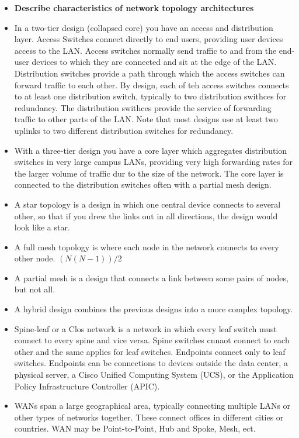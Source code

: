 \documentclass{article}
\begin{document}
\begin{itemize}
  \item \textbf{Describe characteristics of network topology architectures}
  	\item[] In a two-tier design (collapsed core) you have an access and distribution layer. Access Switches connect directly to end users, providing user devices access to the LAN. Access switches normally send traffic to and from the end-user devices to which they are connected and sit at the edge of the LAN. Distribution switches provide a path through which the access switches can forward traffic to each other. By design, each of teh access switches connects to at least one distribution switch, typically to two distribution swithces for redundancy. The distribution swithces provide the service of forwarding traffic to other parts of the LAN. Note that most designs use at least two uplinks to two different distribution switches for redundancy.
  	\item[] With a three-tier design you have a core layer which aggregates distribution switches in very large campus LANs, providing very high forwarding rates for the larger volume of traffic dur to the size of the network. The core layer is connected to the distribution switches often with a partial mesh design.
  	\item[] A star topology is a design in which one central device connects to several other, so that if you drew the links out in all directions, the design would look like a star.	
  	\item[] A full mesh topology is where each node in the network connects to every other node. $(N(N-1))/2$
  	\item[] A partial mesh is a design that connects a link between some pairs of nodes, but not all.
  	\item[] A hybrid design combines the previous designs into a more complex topology.
  
  	\item[] Spine-leaf or a Clos network is a network in which every leaf switch must connect to every spine and vice versa. Spine switches cnnaot connect to each other and the same applies for leaf switches. Endpoints connect only to leaf switches. Endpoints can be connections to devices outside the data center, a physical server, a Cisco Unified Computing System (UCS), or the Application Policy Infrastructure Controller (APIC).
  	
  	\item[] WANs span a large geographical area, typically connecting multiple LANs or other types of networks together. These connect offices in different cities or countries. WAN may be Point-to-Point, Hub and Spoke, Mesh, ect.
  	

\end{itemize}
\end{document}
